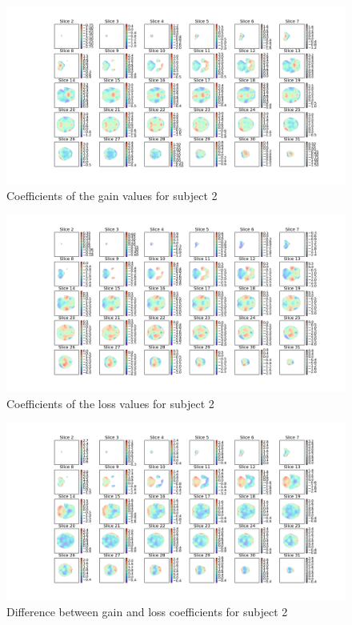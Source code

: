 \begin{figure}[H]
    \centering
        \includegraphics[scale=0.42]{figures/sub2gain_heatmap.png}
    \caption{Coefficients of the gain values for subject 2}
\end{figure}

\begin{figure}[H]
    \centering
        \includegraphics[scale=0.42]{figures/sub2loss_heatmap.png}
    \caption{Coefficients of the loss values for subject 2}
\end{figure}

\begin{figure}[H]
    \centering
        \includegraphics[scale=0.42]{figures/sub2diff_heatmap.png}
    \caption{Difference between gain and loss coefficients for subject 2}
\end{figure}

